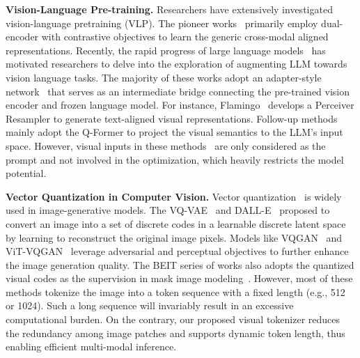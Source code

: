 \noindent \textbf{Vision-Language Pre-training.}
Researchers have extensively investigated vision-language pretraining (VLP). The pioneer works~\citep{radford2021learning,jia2021scaling} primarily employ dual-encoder with contrastive objectives to learn the generic cross-modal aligned representations. Recently, the rapid progress of large language models~\citep{chowdhery2022palm,touvron2023llama} has motivated researchers to delve into the exploration of augmenting LLM towards vision language tasks. The majority of these works adopt an adapter-style network~\citep{zhang2023llama} that serves as an intermediate bridge connecting the pre-trained vision encoder and frozen language model. For instance, Flamingo~\citep{alayrac2022flamingo} develops a Perceiver Resampler to generate text-aligned visual representations. Follow-up methods~\citep{li2023blip,zhu2023minigpt} mainly adopt the Q-Former to project the visual semantics to the LLM's input space. However, visual inputs in these methods~\citep{huang2023language,alayrac2022flamingo} are only considered as the prompt and not involved in the optimization, which heavily restricts the model potential.

\noindent \textbf{Vector Quantization in Computer Vision.}
Vector quantization~\citep{gray1984vector,nasrabadi1988image} is widely used in image-generative models. The VQ-VAE~\citep{van2017neural} and DALL-E~\citep{ramesh2021zero} proposed to convert an image into a set of discrete codes in a learnable discrete latent space by learning to reconstruct the original image pixels. Models like VQGAN~\citep{esser2021taming} and ViT-VQGAN~\citep{yu2021vector} leverage adversarial and perceptual objectives to further enhance the image generation quality. The BEIT series of works also adopts the quantized visual codes as the supervision in mask image modeling~\citep{peng2022beit,wang2023image}. However, most of these methods tokenize the image into a token sequence with a fixed length (e.g., 512 or 1024). Such a long sequence will invariably result in an excessive computational burden. On the contrary, our proposed visual tokenizer reduces the redundancy among image patches and supports dynamic token length, thus enabling efficient multi-modal inference.

